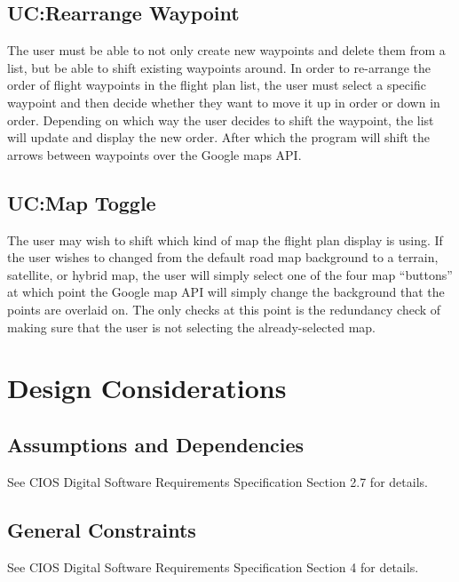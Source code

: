 \documentclass[12pt, letterpaper]{article}
\begin{document}
\clearpage
\subsection{UC:Rearrange Waypoint}\label{sec:rearrangewp}
The user must be able to not only create new waypoints and delete them from a list, but be able to shift existing waypoints around.
In order to re-arrange the order of flight waypoints in the flight plan list, the user must select a specific waypoint and then decide whether they want to move it up in order or down in order.
Depending on which way the user decides to shift the waypoint, the list will update and display the new order.
After which the program will shift the arrows between waypoints over the Google maps API.

\clearpage
\subsection{UC:Map Toggle}
The user may wish to shift which kind of map the flight plan display is using.
If the user wishes to changed from the default road map background to a terrain, satellite, or hybrid map, the user will simply select one of the four map “buttons” at which point the Google map API will simply change the background that the points are overlaid on.
The only checks at this point is the redundancy check of making sure that the user is not selecting the already-selected map.

\clearpage
\section{Design Considerations} \label{dsign}
  \subsection{Assumptions and Dependencies}
    See CIOS Digital Software Requirements Specification Section 2.7 for details.
  \subsection{General Constraints}
    See CIOS Digital Software Requirements Specification Section 4 for details.
\end{document}
